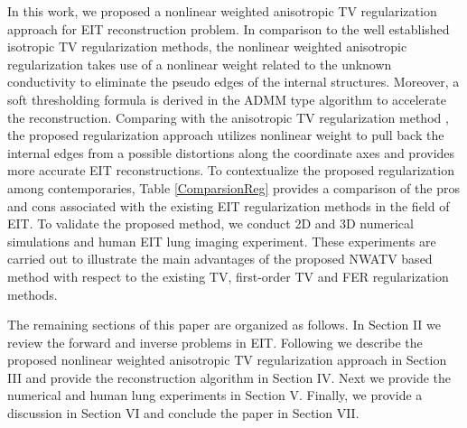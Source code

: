 \documentclass[lettersize,journal]{IEEEtran}
\begin{document}
In this work, we proposed a nonlinear weighted anisotropic TV regularization approach for EIT reconstruction problem.
In comparison to the well established isotropic TV regularization methods, the nonlinear weighted anisotropic regularization takes use of a nonlinear weight related to the unknown conductivity to eliminate the pseudo edges of the internal structures. Moreover, a soft thresholding formula is derived in the ADMM \cite{Boyd2011} type algorithm to accelerate the reconstruction. Comparing with the anisotropic TV regularization method \cite{Borsic2010,Jung2015}, the proposed regularization approach utilizes nonlinear weight to pull back the internal edges from a possible distortions along the coordinate axes \cite{Gonzalez2017} and provides more accurate EIT reconstructions.
To contextualize the proposed regularization among contemporaries,
Table \ref{ComparsionReg} provides a comparison of the pros and cons
associated with the existing EIT regularization methods in the field of EIT.
To validate the proposed method, we conduct 2D and 3D numerical simulations and human EIT lung imaging experiment.
These experiments are carried out to illustrate the main advantages of the proposed NWATV based method with respect to the existing TV, first-order TV and FER regularization methods.

The remaining sections of this paper are organized as follows. In Section II we review the forward and inverse problems in EIT. Following we describe the proposed nonlinear weighted anisotropic TV regularization approach in Section III and provide the reconstruction algorithm in Section IV. Next we provide the numerical and human lung experiments in Section V. Finally, we provide a discussion in Section VI and conclude the paper in Section VII.
\end{document}
